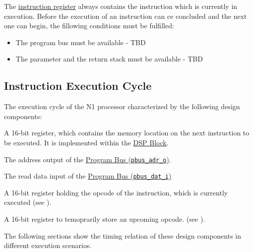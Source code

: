 The \hyperref[architecture:comp:ir]{instruction register} always contains the instruction which is currently in execution.
Before the execution of an instruction can ce concluded and the next one can begin, the fillowing conditions must be fulfilled:
\begin{itemize}

\item   
The program bus must be available - TBD
  
\item   
The parameter and the return stack must be available - TBD
  
\end{itemize}

\subsection{Instruction Execution Cycle}
\label{architecture:excyc}

The execution cycle of the N1 processor characterized by the following design components:
\begin{description}[style=nextline]

\item[\textbf{Program Counter}]
A 16-bit register, which contains the memory location on the next instruction to be executed.  
It is implemented within the \hyperref[architecture:comp:dsp]{DSP Block}.

\item[\textbf{Address Bus}]
The address output of the \hyperref[integration:if:pbus]{Program Bus (\texttt{pbus\_adr\_o})}.

\item[\textbf{Read Data Bus}]
The read data input of the \hyperref[integration:if:pbus]{Program Bus (\texttt{pbus\_dat\_i})}

\item[\textbf{Instruction Register}]
A 16-bit register holding the opcode of the instruction, which is currently executed (see ).

\item[\textbf{Instruction Stash Register}]
A 16-bit register to temoprarily store an upcoming opcode. (see ).

\end{description}

The following sections show the timing relation of these design components in different execution scenarios.


